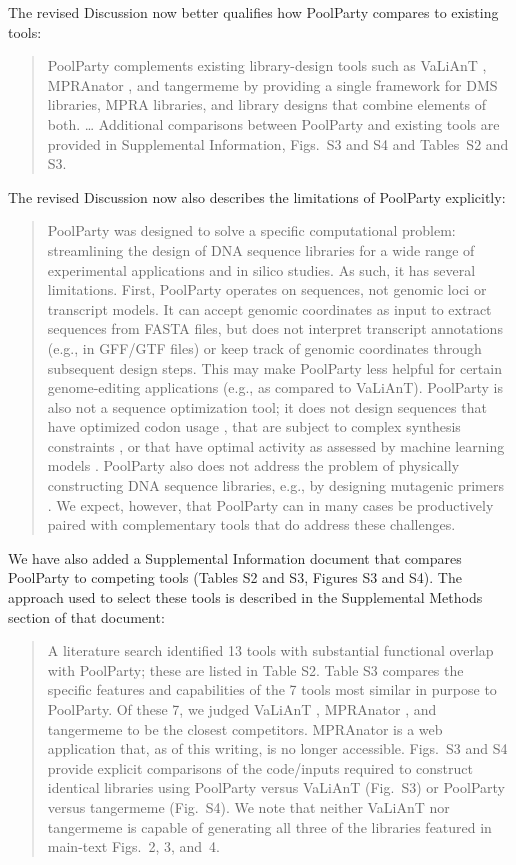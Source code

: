 \documentclass[11pt]{article}
\newenvironment{response}{\par\color{responseblue}}{\par}
\newenvironment{msquote}
  {\begin{quote}\color{quotedtext}\noindent\ignorespaces}
  {\end{quote}}
\begin{document}
\begin{response}
The revised Discussion now better qualifies how PoolParty compares to existing tools:
  \begin{msquote}
    PoolParty complements existing library-design tools such as VaLiAnT \citep{Barbon2022th}, MPRAnator \citep{GeorgakopoulosSoares2017gb}, and tangermeme \citep{Schreiber2025nd} by providing a single framework for DMS libraries, MPRA libraries, and library designs that combine elements of both. \ldots{} Additional comparisons between PoolParty and existing tools are provided in Supplemental Information, Figs.~S3 and S4 and Tables~S2 and S3.
  \end{msquote}
The revised Discussion now also describes the limitations of PoolParty explicitly:
  \begin{msquote}
    PoolParty was designed to solve a specific computational problem: streamlining the design of DNA sequence libraries for a wide range of experimental applications and in silico studies. As such, it has several limitations. First, PoolParty operates on sequences, not genomic loci or transcript models. It can accept genomic coordinates as input to extract sequences from FASTA files, but does not interpret transcript annotations (e.g., in GFF/GTF files) or keep track of genomic coordinates through subsequent design steps. This may make PoolParty less helpful for certain genome-editing applications (e.g., as compared to VaLiAnT). PoolParty is also not a sequence optimization tool; it does not design sequences that have optimized codon usage \citep{Swainston2017rb}, that are subject to complex synthesis constraints \citep{Zulkower2020jk}, or that have optimal activity as assessed by machine learning models \citep{Schreiber2025ledidi}. PoolParty also does not address the problem of physically constructing DNA sequence libraries, e.g., by designing mutagenic primers \citep{Hiraga2021yg}. We expect, however, that PoolParty can in many cases be productively paired with complementary tools that do address these challenges.
  \end{msquote}

We have also added a Supplemental Information document that compares PoolParty to competing tools (Tables S2 and S3, Figures S3 and S4). The approach used to select these tools is described in the Supplemental Methods section of that document:
  \begin{msquote}
    A literature search identified 13 tools with substantial functional overlap with PoolParty; these are listed in Table S2. Table S3 compares the specific features and capabilities of the 7 tools most similar in purpose to PoolParty. Of these 7, we judged VaLiAnT \citep{Barbon2022th}, MPRAnator \citep{GeorgakopoulosSoares2017gb}, and tangermeme \citep{Schreiber2025nd} to be the closest competitors. MPRAnator is a web application that, as of this writing, is no longer accessible. Figs.~S3 and S4 provide explicit comparisons of the code/inputs required to construct identical libraries using PoolParty versus VaLiAnT (Fig.~S3) or PoolParty versus tangermeme (Fig.~S4). We note that neither VaLiAnT nor tangermeme is capable of generating all three of the libraries featured in main-text Figs.~2, 3, and~4.
  \end{msquote}


\end{response}
\end{document}
